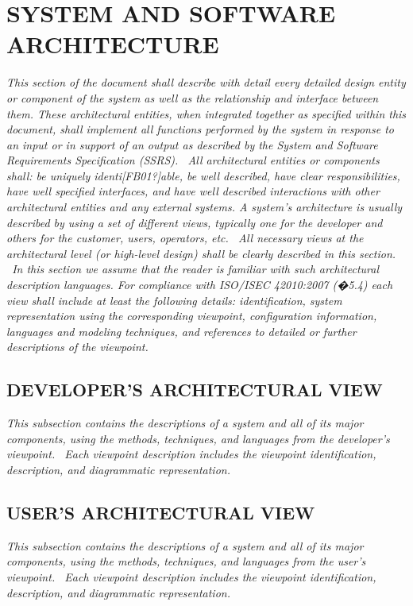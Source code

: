 \documentclass[twoside,letterpaper]{article}
\begin{document}
\section[SYSTEM AND SOFTWARE
ARCHITECTURE]{\bfseries\color{black} SYSTEM AND
SOFTWARE ARCHITECTURE}
{\itshape\color{black}
This section of the document shall describe with detail every detailed
design entity or component of the system as well as the relationship
and interface between them. These architectural entities, when
integrated together as specified within this document, shall implement
all functions performed by the system in response to an input or in
support of an output as described by the System and Software
Requirements Specification (SSRS). \ All architectural entities or
components shall: be uniquely identi[FB01?]able, be well described,
have clear responsibilities, have well specified interfaces, and have
well described interactions with other architectural entities and any
external systems. A system{\textquoteright}s architecture is usually
described by using a set of different views, typically one for the
developer and others for the customer, users, operators, etc. \ All
necessary views at the architectural level (or high-level design) shall
be clearly described in this section. \ In this section we assume that
the reader is familiar with such architectural description languages.
For compliance with ISO/ISEC 42010:2007 (�5.4) each view shall include
at least the following details: identification, system representation
using the corresponding viewpoint, configuration information, languages
and modeling techniques, and references to detailed or further
descriptions of the viewpoint. \ }

\subsection[DEVELOPER{\textquoteright}S ARCHITECTURAL
VIEW]{\bfseries\color{black}
DEVELOPER{\textquoteright}S ARCHITECTURAL VIEW}
{\itshape\color{black}
This subsection contains the descriptions of a system and all of its
major components, using the methods, techniques, and languages from the
developer{\textquoteright}s viewpoint. \ Each viewpoint description
includes the viewpoint identification, description, and diagrammatic
representation. }

\subsection[USER{\textquoteright}S ARCHITECTURAL
VIEW]{\bfseries\color{black}
USER{\textquoteright}S ARCHITECTURAL VIEW}
{\itshape\color{black}
This subsection contains the descriptions of a system and all of its
major components, using the methods, techniques, and languages from the
user{\textquoteright}s viewpoint. \ Each viewpoint description includes
the viewpoint identification, description, and diagrammatic
representation. }
\end{document}
